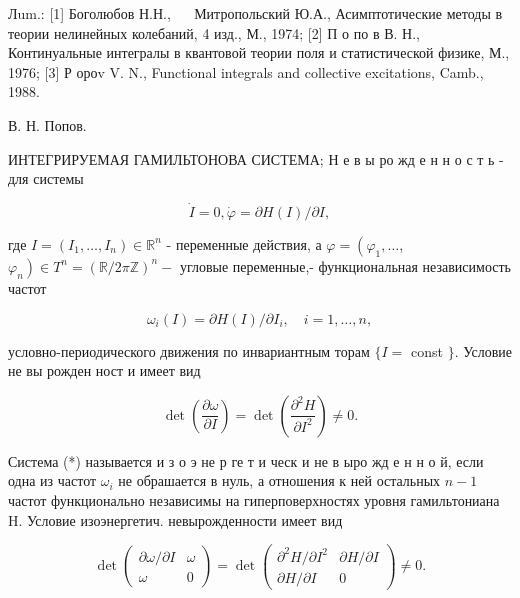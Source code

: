 \documentclass[10pt]{article}
\begin{document}
Лum.: [1] Боголюбов Н.Н., $\quad$ Митропольский Ю.А., Асимптотические методы в теории нелинейных колебаний, 4 изд., М., 1974; [2] П о по в В. Н., Континуальные интегралы в квантовой теории поля и статистической физике, М., 1976; [3] Р ороv V. N., Functional integrals and collective excitations, Camb., 1988.



В. Н. Попов.



ИНТЕГРИРУЕМАЯ ГАМИЛЬТОНОВА СИСТЕМА; Н е в ы ро жд е н н о с т ь - для системы



\[

\dot{I}=0, \dot{\varphi}=\partial H(I) / \partial I,

\]



где $I=\left(I_{1}, \ldots, I_{n}\right) \in \mathbb{R}^{n}$ - переменные действия, а $\varphi=\left(\varphi_{1}, \ldots\right.$, $\left.\varphi_{n}\right) \in T^{n}=(\mathbb{R} / 2 \pi \mathbb{Z})^{n}-$ угловые переменные,- функциональная независимость частот



\[

\omega_{i}(I)=\partial H(I) / \partial I_{i}, \quad i=1, \ldots, n,

\]



условно-периодического движения по инвариантным торам $\{I=$ const $\}$. Условие не вы рожден ност и имеет вид



\[

\operatorname{det}\left(\frac{\partial \omega}{\partial I}\right)=\operatorname{det}\left(\frac{\partial^{2} H}{\partial I^{2}}\right) \neq 0 .

\]



Система (*) называется и з о э не р ге т и ческ и не в ыро жд е н н о й, если одна из частот $\omega_{i}$ не обрашается в нуль, а отношения к ней остальных $n-1$ частот функционально независимы на гиперповерхностях уровня гамильтониана H. Условие изоэнергетич. невырожденности имеет вид



\[

\operatorname{det}\left(\begin{array}{cc}

\partial \omega / \partial I & \omega \\

\omega & 0

\end{array}\right)=\operatorname{det}\left(\begin{array}{cc}

\partial^{2} H / \partial I^{2} & \partial H / \partial I \\

\partial H / \partial I & 0

\end{array}\right) \neq 0 .

\]
\end{document}
